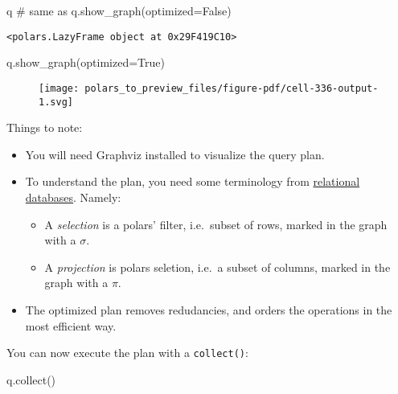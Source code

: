 \documentclass[
  letterpaper,
  DIV=11,
  numbers=noendperiod]{scrartcl}
\newenvironment{Shaded}{\begin{snugshade}}{\end{snugshade}}
\newcommand{\CommentTok}[1]{\textcolor[rgb]{0.37,0.37,0.37}{#1}}
\newcommand{\NormalTok}[1]{\textcolor[rgb]{0.00,0.23,0.31}{#1}}
\newcommand{\OperatorTok}[1]{\textcolor[rgb]{0.37,0.37,0.37}{#1}}
\newcommand{\VariableTok}[1]{\textcolor[rgb]{0.07,0.07,0.07}{#1}}
\providecommand{\tightlist}{%
  \setlength{\itemsep}{0pt}\setlength{\parskip}{0pt}}\usepackage{longtable,booktabs,array}
\begin{document}
\begin{Shaded}
\begin{Highlighting}[]
\NormalTok{q }\CommentTok{\# same as q.show\_graph(optimized=False)}
\end{Highlighting}
\end{Shaded}

\begin{verbatim}
<polars.LazyFrame object at 0x29F419C10>
\end{verbatim}

\begin{Shaded}
\begin{Highlighting}[]
\NormalTok{q.show\_graph(optimized}\OperatorTok{=}\VariableTok{True}\NormalTok{)}
\end{Highlighting}
\end{Shaded}

\begin{figure}[H]

{\centering \texttt{[image: polars\_to\_preview\_files/figure-pdf/cell-336-output-1.svg]}

}

\end{figure}

Things to note:

\begin{itemize}
\tightlist
\item
  You will need Graphviz installed to visualize the query plan.
\item
  To understand the plan, you need some terminology from
  \href{https://www.ibm.com/docs/en/informix-servers/14.10?topic=concepts-selection-projection}{relational
  databases}. Namely:

  \begin{itemize}
  \tightlist
  \item
    A \emph{selection} is a polars' filter, i.e.~subset of rows, marked
    in the graph with a \(\sigma\).
  \item
    A \emph{projection} is polars seletion, i.e.~a subset of columns,
    marked in the graph with a \(\pi\).
  \end{itemize}
\item
  The optimized plan removes redudancies, and orders the operations in
  the most efficient way.
\end{itemize}

You can now execute the plan with a \texttt{collect()}:

\begin{Shaded}
\begin{Highlighting}[]
\NormalTok{q.collect()}
\end{Highlighting}
\end{Shaded}
\end{document}
